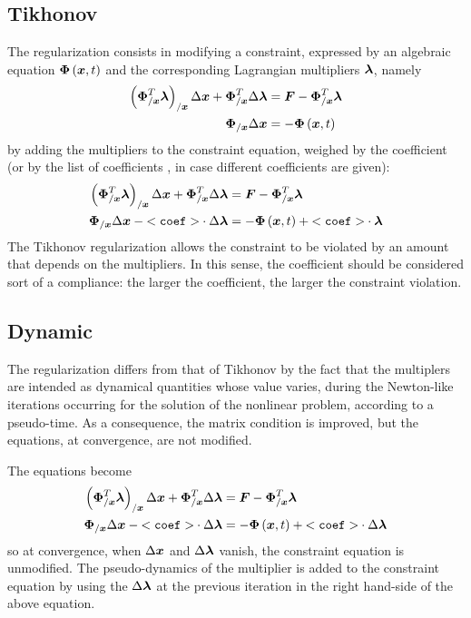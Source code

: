 \subsection{Tikhonov}
The  regularization consists in modifying
a constraint, expressed by an algebraic equation $\boldsymbol{\Phi}\left( \boldsymbol{x}, t \right)$
and the corresponding Lagrangian multipliers $\boldsymbol{\lambda}$, namely
\begin{align}
	\left( \boldsymbol{\Phi}_{/\boldsymbol{x}}^T \boldsymbol{\lambda} \right)_{/\boldsymbol{x}} \Delta\boldsymbol{x}
	+ \boldsymbol{\Phi}_{/\boldsymbol{x}}^T \Delta\boldsymbol{\lambda}
		&= \boldsymbol{F} - \boldsymbol{\Phi}_{/\boldsymbol{x}}^T \boldsymbol{\lambda} \\
	\boldsymbol{\Phi}_{/\boldsymbol{x}} \Delta\boldsymbol{x} &= - \boldsymbol{\Phi}\left( \boldsymbol{x}, t \right)
\end{align}
by adding the multipliers to the constraint equation,
weighed by the coefficient  (or by the list of coefficients
, in case different coefficients are given):
\begin{align}
	\left( \boldsymbol{\Phi}_{/\boldsymbol{x}}^T \boldsymbol{\lambda} \right)_{/\boldsymbol{x}} \Delta\boldsymbol{x}
	+ \boldsymbol{\Phi}_{/\boldsymbol{x}}^T \Delta\boldsymbol{\lambda}
	&= \boldsymbol{F} - \boldsymbol{\Phi}_{/\boldsymbol{x}}^T \boldsymbol{\lambda} \\
	\boldsymbol{\Phi}_{/\boldsymbol{x}} \Delta\boldsymbol{x}
	- \mathtt{<coef>} \cdot \Delta\boldsymbol{\lambda}
	&= - \boldsymbol{\Phi}\left( \boldsymbol{x}, t \right) + \mathtt{<coef>} \cdot \boldsymbol{\lambda}
\end{align}
The Tikhonov regularization allows the constraint to be violated
by an amount that depends on the multipliers.
In this sense, the coefficient  should be considered
sort of a compliance: the larger the coefficient,
the larger the constraint violation.

\subsection{Dynamic}
The  regularization differs from that of Tikhonov
by the fact that the multiplers are intended as dynamical quantities
whose value varies, during the Newton-like iterations occurring
for the solution of the nonlinear problem, according to a pseudo-time.
As a consequence, the matrix condition is improved, but the equations,
at convergence, are not modified.

The equations become
\begin{align}
	\left( \boldsymbol{\Phi}_{/\boldsymbol{x}}^T \boldsymbol{\lambda} \right)_{/\boldsymbol{x}} \Delta\boldsymbol{x}
	+ \boldsymbol{\Phi}_{/\boldsymbol{x}}^T \Delta\boldsymbol{\lambda}
	&= \boldsymbol{F} - \boldsymbol{\Phi}_{/\boldsymbol{x}}^T \boldsymbol{\lambda} \\
	\boldsymbol{\Phi}_{/\boldsymbol{x}} \Delta\boldsymbol{x}
	- \mathtt{<coef>} \cdot \Delta \boldsymbol{\lambda}
	&= - \boldsymbol{\Phi}\left( \boldsymbol{x}, t \right) + \mathtt{<coef>} \cdot \Delta\boldsymbol{\lambda}
\end{align}
so at convergence, when $\Delta\boldsymbol{x}$ and $\Delta\boldsymbol{\lambda}$ vanish,
the constraint equation is unmodified.
The pseudo-dynamics of the multiplier is added to the constraint equation
by using the $\Delta\boldsymbol{\lambda}$ at the previous iteration
in the right hand-side of the above equation.


